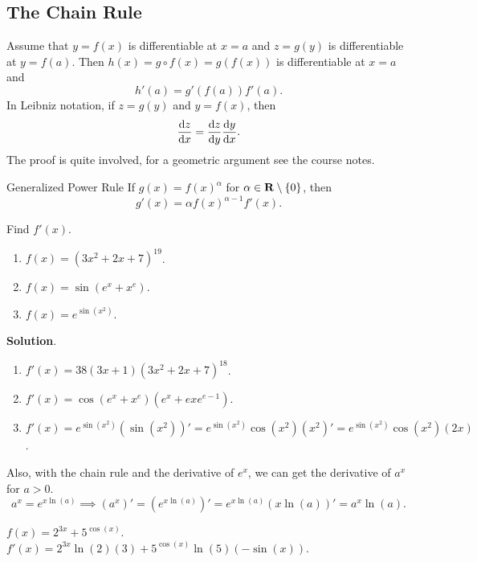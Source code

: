 \subsection{The Chain Rule}
\begin{Theorem}{}{}
    Assume that $ y=f(x) $ is differentiable at $ x=a $ and $ z=g(y) $ is differentiable at $ y=f(a) $. Then $ h(x)=g\circ f(x)=g(f(x)) $ is differentiable at $ x=a $
    and
    \[ h'(a)=g'(f(a))f'(a). \]
    In Leibniz notation, if $ z=g(y) $ and $ y=f(x) $, then
    \[ \odv{z}{x}=\odv{z}{y}\odv{y}{x}. \]
    \tcblower{}
    The proof is quite involved, for a geometric argument see the course notes.
\end{Theorem}
\begin{Corollary}{Generalized Power Rule}{}
    If $ g(x)=f(x)^\alpha $ for $ \alpha\in\mathbf{R}\setminus \{0\} $, then
    \[ g'(x)=\alpha f(x)^{\alpha-1}f'(x). \]
\end{Corollary}
\begin{Example}{}{}
    Find $ f'(x) $.
    \begin{enumerate}[(1)]
        \item $ f(x)=(3x^2+2x+7)^{19} $.
        \item $ f(x)=\sin(e^x+x^e) $.
        \item $ f(x)=e^{\sin(x^2)} $.
    \end{enumerate}
    \tcblower{}
    \textbf{Solution}.
    \begin{enumerate}[(1)]
        \item $ f'(x)=38(3x+1)(3x^2+2x+7)^{18} $.
        \item $ f'(x)=\cos(e^x+x^e)(e^x+e xe^{e-1}) $.
        \item $ f'(x)=e^{\sin(x^2)}(\sin(x^2))'=e^{\sin(x^2)}\cos(x^2)(x^2)'=e^{\sin(x^2)}\cos(x^2)(2x) $.
    \end{enumerate}
\end{Example}
Also, with the chain rule and the derivative of $ e^x $, we can get the derivative of $ a^x $ for $ a>0 $.
\[ a^x=e^{x\ln(a)}\implies (a^x)'=(e^{x\ln(a)})'=e^{x\ln(a)}(x\ln(a))'=a^x\ln(a).  \]
\begin{Example}{}{}
    $ f(x)=2^{3x}+5^{\cos(x)} $. $ f'(x)=2^{3x}\ln(2)(3)+5^{\cos(x)}\ln(5)(-\sin(x)) $.
\end{Example}
